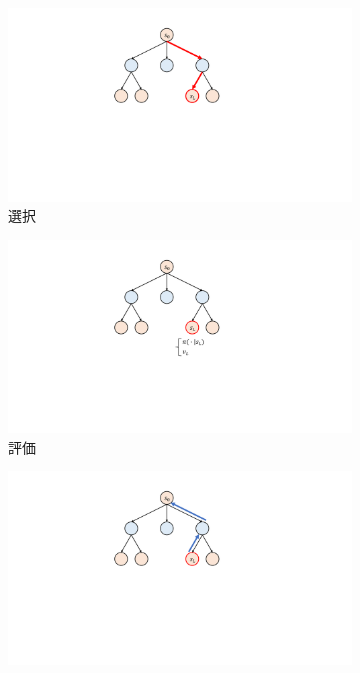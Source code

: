 \begin{figure}
  \begin{subfigure}[T]{0.4\columnwidth}
    \centering
    \includegraphics[width=\columnwidth]{figures/selection_.pdf}
    \caption{選択}
    \label{fig:selection}
  \end{subfigure}
  \begin{subfigure}[T]{0.4\columnwidth}
    \centering
    \includegraphics[width=\columnwidth]{figures/evaluate_.pdf}
    \caption{評価}
    \label{fig:evaluate}
  \end{subfigure}
  \begin{subfigure}[T]{0.4\columnwidth}
    \centering
    \includegraphics[width=\columnwidth]{figures/backpropagate_.pdf}

\end{subfigure}
\end{figure}
